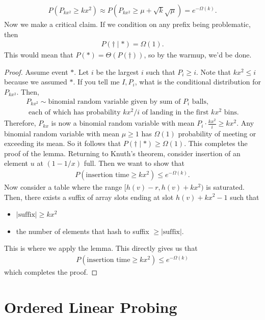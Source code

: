 \documentclass{report}
\begin{document}
\begin{align*}
    P(P_{kx^2} \geq kx^2) \approx P(P_{kx^2} \geq \mu + \sqrt k \sqrt \mu) = e^{-\Omega(k)}.
\end{align*}
Now we make a critical claim. If we condition on any prefix being problematic, then
\begin{align*}
    P(\dagger \mid *) = \Omega(1).
\end{align*}
This would mean that $P(*) = \Theta(P(\dagger))$, so by the warmup, we'd be done.
\begin{proof}
    Assume event $*$. Let $i$ be the largest $i$ such that $P_i \geq i$. Note that $kx^2 \leq i$ because we assumed $*$. If you tell me $I, P_i$, what is the conditional distribution for $P_{kx^2}$. Then,
    \begin{align*}
        P_{kx^2} \sim \text{binomial random variable given by sum of $P_i$ balls,} \\
        \text{ each of which has probability $kx^2/i$ of landing in the first $kx^2$ bins.}
    \end{align*}
    Therefore, $P_{kx}$ is now a binomial random variable with mean $P_i \cdot \frac{kx^2}{i} \geq kx^2$. Any binomial random variable with mean $\mu \geq 1$ has $\Omega(1)$ probability of meeting or exceeding its mean. So it follows that $P(\dagger \mid *) \geq \Omega(1)$.  This completes the proof of the lemma.
    \newpage
    \noindent Returning to Knuth's theorem, consider insertion of an element $u$ at $(1 - 1/x)$ full. Then we want to show that
    \begin{align*}
        P(\text{insertion time} \geq kx^2) \leq e^{-\Omega(k)}.
    \end{align*}
    Now consider a table where the range $[h(v) -r, h(v) + kx^2)$ is saturated. Then, there exists a suffix of array slots ending at slot $h(v) + kx^2 - 1$ such that 
    \begin{itemize}
        \item $|\text{suffix}| \geq kx^2$
        \item the number of elements that hash to suffix $\geq |\text{suffix}|$.
    \end{itemize}
    This is where we apply the lemma. This directly gives us that 
    \begin{align*}
        P(\text{insertion time} \geq kx^2) \leq e^{-\Omega(k)}
    \end{align*}
    which completes the proof.  
\end{proof}

\section{Ordered Linear Probing}
\end{document}
